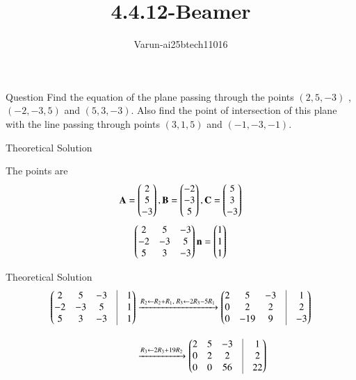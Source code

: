 \documentclass{beamer}
\title %
{4.4.12-Beamer}
\author %
{Varun-ai25btech11016}
\begin{document}
\frame{\titlepage}
\begin{frame}{Question}
Find the equation of the plane passing through the points $(2, 5, -3)$ , $(-2, -3, 5)$ and
$(5, 3, -3)$. Also find the point of intersection of this plane with the line passing
through points $(3, 1, 5)$ and $(-1, -3, -1)$.
\end{frame}
\begin{frame}{Theoretical Solution }

The points are 
\begin{align}
\mathbf{A}=\begin{pmatrix}2\\5\\-3\end{pmatrix}  ,\mathbf{B}=\begin{pmatrix}-2\\-3\\5\end{pmatrix} , \mathbf{C}=\begin{pmatrix}5\\3\\-3\end{pmatrix}
\end{align}
\begin{align} 
\begin{pmatrix}2 & 5 & -3 \\
-2 & -3 & 5  \\
5 & 3 & -3 \end{pmatrix}\mathbf{n}&=\begin{pmatrix}1\\1\\1\end{pmatrix}\\
\end{align}
\end{frame}
\begin{frame}{Theoretical Solution }
\begin{align}
\myvec{2 & 5 & -3 & \vline & 1 \\
-2 & -3 & 5 & \vline & 1 \\
5 & 3 & -3 & \vline & 1}\nonumber
&\xrightarrow{R_2 \leftarrow R_2 + R_1,\; R_3 \leftarrow 2R_3 - 5R_1}
\myvec{2 & 5 & -3 & \vline & 1 \\
0 & 2 & 2 & \vline & 2 \\
0 & -19 & 9 & \vline & -3}\nonumber
\\[1em]
&\xrightarrow{R_3 \leftarrow 2R_3 + 19R_2}
\myvec{2 & 5 & -3 & \vline & 1 \\
0 & 2 & 2 & \vline & 2 \\
0 & 0 & 56 & \vline & 22}\nonumber
\\[1em]
\end{align}
\end{frame}
\end{document}
